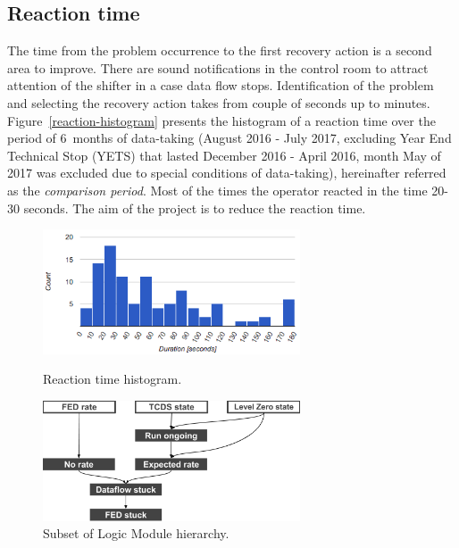 \documentclass[a4paper]{jpconf}
\begin{document}
\subsection{Reaction time} \label{reaction-section}
The time from the problem occurrence to the first recovery action is a second area to improve. There are sound notifications in the control room to attract attention of the shifter in a case data flow stops. Identification of the problem and selecting the recovery action takes from couple of seconds up to minutes. Figure~\ref{reaction-histogram} presents the histogram of a reaction time over the period of 6~months of data-taking (August 2016 - July 2017, excluding Year End Technical Stop (YETS) that lasted December 2016 - April 2016, month May of 2017 was excluded due to special conditions of data-taking), hereinafter referred as the {\it comparison period}. Most of the times the operator reacted in the time 20-30 seconds. The aim of the project is to reduce the reaction time.

\begin{figure}[h]
\begin{minipage}{18pc}
\includegraphics[width=18pc]{reaction-histogram-2016.png}
\caption{\label{reaction-histogram}Reaction time histogram.}
\end{minipage}\hspace{2pc}%
\begin{minipage}{18pc}
\includegraphics[width=18pc]{logic-module-hierarchy.png}
\caption{\label{subsetoflm}Subset of Logic Module hierarchy.}
\end{minipage} 
\end{figure}
\end{document}
